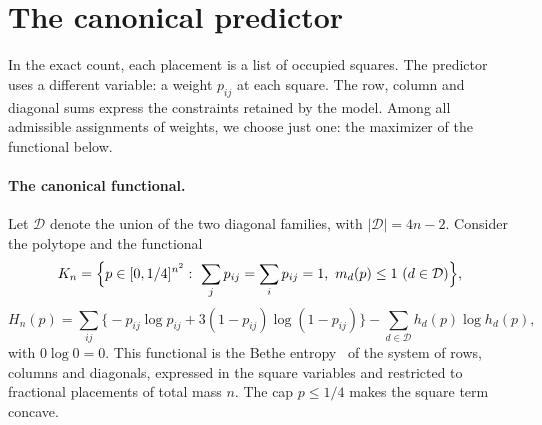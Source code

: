 \section{The canonical predictor}\label{sec:predictor}

In the exact count, each placement is a list of occupied squares. The predictor uses a different variable:
a weight $p_{ij}$ at each square. The row, column and diagonal sums express the constraints retained by the
model.
Among all admissible assignments of weights, we choose just one: the maximizer of the functional below.

\paragraph{The canonical functional.}
Let $\mathcal D$ denote the union of the two diagonal families, with $|\mathcal D|=4n-2$. Consider the
polytope and the functional
\begin{equation}\label{eq:Kn}
 K_n=\Bigl\{p\in[0,1/4]^{n^2}:\ \sum_jp_{ij}=\sum_ip_{ij}=1,\ m_d(p)\le1\ (d\in\mathcal D)\Bigr\},
\end{equation}
\begin{equation}\label{eq:Hn}
 H_n(p)=\sum_{ij}\bigl\{-p_{ij}\log p_{ij}+3(1-p_{ij})\log(1-p_{ij})\bigr\}-\sum_{d\in\mathcal D}h_d(p)\log
h_d(p),
\end{equation}
with $0\log0=0$. This functional is the Bethe entropy~\cite{YFW} of the system of rows, columns and
diagonals, expressed in the square variables and restricted to fractional placements of total mass $n$.
The cap $p\le1/4$ makes the square term concave.

